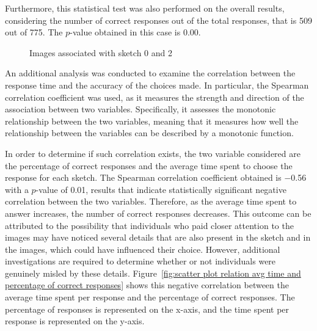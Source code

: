 \noindent Furthermore, this statistical test was also performed on the overall results, considering the number of correct responses out of the total responses, that is \num{509} out of \num{775}. The $p$-value obtained in this case is \num{0.00}.\\
\begin{figure}[!ht]
    \centering
     \quad
    \caption{Images associated with sketch \num{0} and \num{2}}
    \label{fig:similar images sketch 0 and 2}
\end{figure}

\noindent An additional analysis was conducted to examine the correlation between the response time and the accuracy of the choices made. 
In particular, the Spearman correlation coefficient was used, as it measures the strength and direction of the association between two variables. Specifically, it assesses the monotonic relationship between the two variables, meaning that it measures how well the relationship between the variables can be described by a monotonic function. 

\noindent In order to determine if such correlation exists, the two variable considered are the percentage of correct responses and the average time spent to choose the response for each sketch. The Spearman correlation coefficient obtained is \num{-0.56} with a $p$-value of \num{0.01}, results that indicate statistically significant negative correlation between the two variables. Therefore, as the average time spent to answer increases, the number of correct responses decreases. This outcome can be attributed to the possibility that individuals who paid closer attention to the images may have noticed several details that are also present in the sketch and in the images, which could have influenced their choice. However, additional investigations are required to determine whether or not individuals were genuinely misled by these details.
Figure~\ref{fig:scatter plot relation avg time and percentage of correct responses} shows this negative correlation between the average time spent per response and the percentage of correct responses. The percentage of responses is represented on the x-axis, and the time spent per response is represented on the y-axis.

